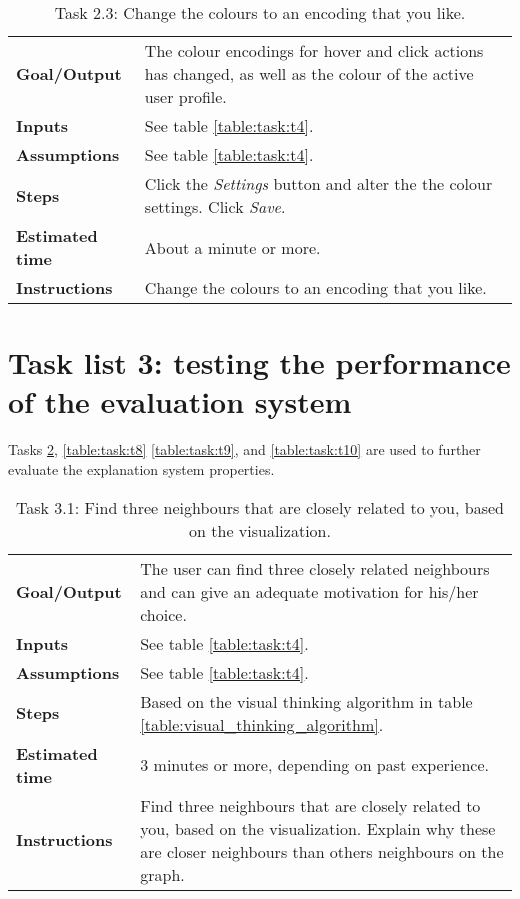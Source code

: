 \begin{table}
	\caption{Task 2.3: Change the colours to an encoding that you like.}
	\begin{tabular}{ p{80px} | p{350px} }
		\hline
		\textbf{Goal/Output}			& The colour encodings for hover and click actions has changed, as well as the colour of the active user profile. \\
		\textbf{Inputs}						& See table \ref{table:task:t4}. \\
		\textbf{Assumptions}			& See table \ref{table:task:t4}. \\
		\textbf{Steps}						& Click the \emph{Settings} button and alter the the colour settings. Click \emph{Save}. \\
		\textbf{Estimated time} 	& About a minute or more. \\
		\textbf{Instructions}			& Change the colours to an encoding that you like. \\
		\hline
	\end{tabular}
	\label{table:task:t6}
\end{table}







\section{Task list 3: testing the performance of the evaluation system}\label{appendix:tasklists:prototype3}

Tasks \ref{table:task:t7}, \ref{table:task:t8} \ref{table:task:t9}, and \ref{table:task:t10} are used to further evaluate the explanation system properties.

\begin{table}
	\caption{Task 3.1: Find three neighbours that are closely related to you, based on the visualization.}
	\begin{tabular}{ p{80px} | p{350px} }
		\hline
		\textbf{Goal/Output}			& The user can find three closely related neighbours and can give an adequate motivation for his/her choice. \\
		\textbf{Inputs}						& See table \ref{table:task:t4}. \\
		\textbf{Assumptions}			& See table \ref{table:task:t4}. \\
		\textbf{Steps}						& Based on the visual thinking algorithm in table \ref{table:visual_thinking_algorithm}. \\
		\textbf{Estimated time} 	& $3$ minutes or more, depending on past experience. \\
		\textbf{Instructions}			&
		Find three neighbours that are closely related to you, based on the visualization. Explain why these are closer neighbours than others neighbours on the graph.
		\\
		\hline
	\end{tabular}
	\label{table:task:t7}
\end{table}


